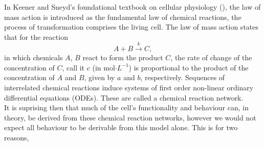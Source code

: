 In Keener and Sneyd's foundational textbook on cellular physiology 
(\cite{keener2009mathematical}), the law of mass action is 
introduced as the fundamental law of chemical reactions, 
the process of transformation comprises the living cell. The law of mass 
action states that for the reaction 
\begin{equation*}
    A + B \xrightarrow{k} C,
\end{equation*}
in which chemicals $A$, $B$ react to form the product $C$, the rate of change of the concentration of $C$, 
call it $c$ (in mol$\cdot L^{-1}$) is proportional to the product of the concentration 
of $A$ and $B$, given by $a$ and $b$, respectively. Sequences of interrelated chemical 
reactions induce systems of first order non-linear ordinary differential equations 
(ODEs). These are called a chemical reaction network.
\\

It is suprising then that much of the cell's functionality and behaviour 
can, in theory, be derived from these chemical reaction networks, however
we would not expect all behaviour to be derivable from this model alone.
This is for two reasons,

